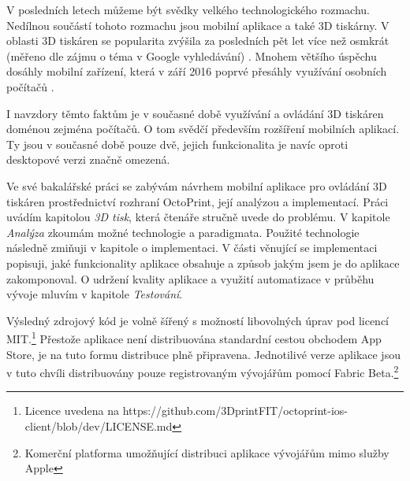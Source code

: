 V posledních letech můžeme být svědky velkého technologického rozmachu.
Nedílnou součástí tohoto rozmachu jsou mobilní aplikace a také 3D tiskárny.
V oblasti 3D tiskáren se popularita zvýšila za posledních pět let více než osmkrát (měřeno dle zájmu o téma v Google vyhledávání) \cite{3d-print-google-trends}.
Mnohem většího úspěchu dosáhly mobilní zařízení, která v září 2016 poprvé přesáhly využívání osobních počítačů \cite{mobile-devices-market-share}.

I navzdory těmto faktům je v současné době využívání a ovládání 3D tiskáren doménou zejména počítačů.
O tom svědčí především rozšíření mobilních aplikací.
Ty jsou v současné době pouze dvě, jejich funkcionalita je navíc oproti desktopové verzi značně omezená.

Ve své bakalářské práci se zabývám návrhem mobilní aplikace pro ovládání 3D tiskáren prostřednictví rozhraní OctoPrint, její analýzou a implementací.
Práci uvádím kapitolou \textit{3D tisk}, která čtenáře stručně uvede do problému.
V kapitole \textit{Analýza} zkoumám možné technologie a paradigmata.
Použité technologie následně zmiňuji v kapitole o implementaci.
V části věnující se implementaci popisuji, jaké funkcionality aplikace obsahuje a způsob jakým jsem je do aplikace zakomponoval.
O udržení kvality aplikace a využití automatizace v průběhu vývoje mluvím v kapitole \textit{Testování}.

Výsledný zdrojový kód je volně šířený s možností libovolných úprav pod licencí MIT.\footnote{Licence uvedena na https://github.com/3DprintFIT/octoprint-ios-client/blob/dev/LICENSE.md}
Přestože aplikace není distribuována standardní cestou obchodem App Store, je na tuto formu distribuce plně připravena.
Jednotilivé verze aplikace jsou v tuto chvíli distribuovány pouze registrovaným vývojářům pomocí Fabric Beta.\footnote{Komerční platforma umožňující distribuci aplikace vývojářům mimo služby Apple}
